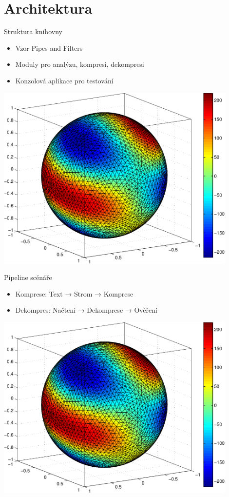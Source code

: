\documentclass[lualatex,hyperref={pdfencoding=auto}]{beamer}
\begin{document}
\section{Architektura}
\begin{frame}{Struktura knihovny}
\begin{itemize}
  \item Vzor Pipes and Filters
  \item Moduly pro analýzu, kompresi, dekompresi
  \item Konzolová aplikace pro testování
\end{itemize}
\includegraphics[width=0.9\textwidth]{fig/sphere_mix_real.pdf}
\end{frame}

\begin{frame}{Pipeline scénáře}
\begin{itemize}
  \item Komprese: Text → Strom → Komprese
  \item Dekompres: Načtení → Dekomprese → Ověření
\end{itemize}
\includegraphics[width=0.9\textwidth]{fig/sphere_mix_real.pdf}
\end{frame}
\end{document}
